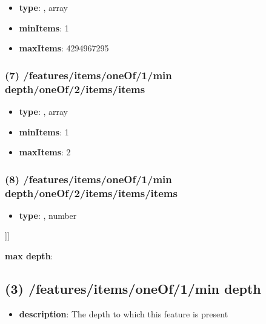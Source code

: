 \begin{itemize}[leftmargin=6em]\item {\bf type}: , array\item {\bf minItems}: 1
\item {\bf maxItems}: 4294967295
\end{itemize}\subsubsection{(7) /features/items/oneOf/1/min depth/oneOf/2/items/items}
\begin{itemize}[leftmargin=7em]\item {\bf type}: , array\item {\bf minItems}: 1
\item {\bf maxItems}: 2
\end{itemize}\subsubsection{(8) /features/items/oneOf/1/min depth/oneOf/2/items/items/items}
\begin{itemize}[leftmargin=8em]\item {\bf type}: , number\end{itemize}]]\item {\bf max depth}: \subsection{(3) /features/items/oneOf/1/min depth}
\begin{itemize}[leftmargin=3em]\item {\bf description}: The depth to which this feature is present
\end{itemize}
